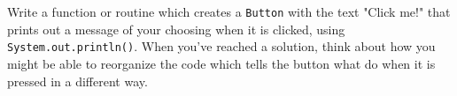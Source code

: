 Write a function or routine which creates a \texttt{Button} with the text "Click me!" that prints out a message of your choosing when it is clicked, using \texttt{System.out.println()}. When you've reached a solution, think about how you might be able to reorganize the code which tells the button what do when it is pressed in a different way.

\begin{answer}



\end{answer}

